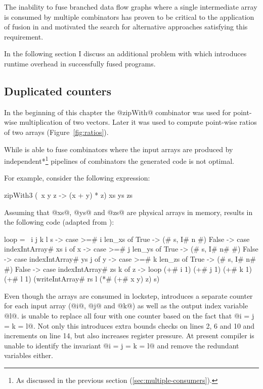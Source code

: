 \documentclass[preamble.tex]{subfiles}
\begin{document}
The inability to fuse branched data flow graphs where a single intermediate array is consumed by multiple combinators has proven to be critical to the application of fusion in \DPH and motivated the search for alternative approaches satisfying this requirement.

In the following section I discuss an additional problem with \StreamFusion which introduces runtime overhead in successfully fused programs.


\subsection{Duplicated counters}
\label{sec:duplicated-counters}

In the beginning of this chapter the @zipWith@ combinator was used for point-wise multiplication of two vectors. Later it was used to compute point-wise ratios of two arrays (Figure~\ref{fig:ratios}).

While \StreamFusion is able to fuse  combinators where the input arrays are produced by \*independent*\footnote{As discussed in the previous section (\ref{sec:multiple-consumers}).} pipelines of combinators the generated code is not optimal.

For example, consider the following expression:

\begin{hscode}
zipWith3 (\ x y z -> (x + y) * z) xs ys zs
\end{hscode}

Assuming that @xs@, @ys@ and @zs@ are physical arrays in memory, \StreamFusion results in the following  code (adapted from \cite{FlowFusion}):

\begin{hscode}[numbers=left]
loop = \ i j k l s ->
  case >=# i len_xs of
    True  -> (# s, I# n #)
    False ->
      case indexIntArray# xs i of x ->
        case >=# j len_ys of
          True  -> (# s, I# n# #)
          False ->
            case indexIntArray# ys j of y ->
              case >=# k len_zs of
                True  -> (# s, I# n# #)
                False ->
                  case indexIntArray# zs k of z ->
                    loop (+# i 1) (+# j 1) (+# k 1) (+# l 1)
                      (writeIntArray# rs l (*# (+# x y) z) s)
\end{hscode}

Even though the arrays are consumed in lockstep, \StreamFusion introduces a separate counter for each input array (@i@, @j@ and @k@) as well as the output index variable @l@. \StreamFusion is unable to replace all four with one counter based on the fact that @i = j = k = l@. Not only this introduces extra bounds checks on lines 2, 6 and 10 and increments on line 14, but also increases register pressure. At present \GHC compiler is unable to identify the invariant @i = j = k = l@ and remove the redundant variables either.
\end{document}
